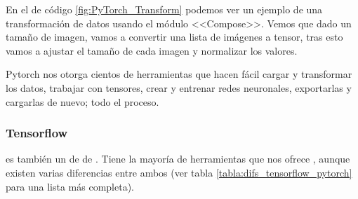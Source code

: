 En el  de código \ref{fig:PyTorch_Transform} podemos ver un ejemplo de una transformación de datos usando el módulo <<Compose>>. Vemos que dado un tamaño de imagen, vamos a convertir una lista de imágenes a tensor, tras esto vamos a ajustar el tamaño de cada imagen y normalizar los valores.


Pytorch nos otorga cientos de herramientas que hacen fácil cargar y transformar los datos, trabajar con tensores, crear y entrenar redes neuronales, exportarlas y cargarlas de nuevo; todo el proceso.

\subsubsection{Tensorflow}

 es también un  de  de . Tiene la mayoría de herramientas que nos ofrece , aunque existen varias diferencias entre ambos (ver tabla \ref{tabla:difs_tensorflow_pytorch} para una lista más completa).

